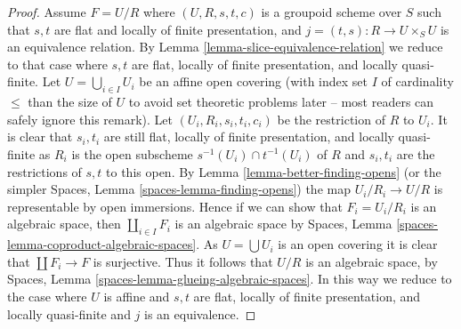 \documentclass[10pt,a4paper]{amsart}
\theoremstyle{plain}
\theoremstyle{definition}
\theoremstyle{remark}
\numberwithin{equation}{subsection}
\begin{document}
\begin{proof}
\medskip\noindent
Assume $F = U/R$ where $(U, R, s, t, c)$ is a groupoid scheme
over $S$ such that $s, t$ are flat and locally of finite presentation, and
$j = (t, s) : R \to U \times_S U$ is an equivalence relation. By
Lemma \ref{lemma-slice-equivalence-relation}
we reduce to that case where $s, t$ are flat,
locally of finite presentation, and locally quasi-finite.
Let $U = \bigcup_{i \in I} U_i$ be an affine open covering
(with index set $I$ of cardinality $\leq$ than the size of $U$ to avoid
set theoretic problems later -- most readers can safely ignore this remark).
Let $(U_i, R_i, s_i, t_i, c_i)$ be the restriction of $R$
to $U_i$. It is clear that $s_i, t_i$ are still flat, locally of finite
presentation, and locally quasi-finite as $R_i$ is the open subscheme
$s^{-1}(U_i) \cap t^{-1}(U_i)$ of $R$
and $s_i, t_i$ are the restrictions of $s, t$ to this open. By
Lemma \ref{lemma-better-finding-opens}
(or the simpler
Spaces, Lemma \ref{spaces-lemma-finding-opens})
the map $U_i/R_i \to U/R$ is representable by open immersions.
Hence if we can show that $F_i = U_i/R_i$ is an algebraic space, then
$\coprod_{i \in I} F_i$ is an algebraic space by
Spaces, Lemma \ref{spaces-lemma-coproduct-algebraic-spaces}.
As $U = \bigcup U_i$ is an open covering it is clear that
$\coprod F_i \to F$ is surjective. Thus
it follows that $U/R$ is an algebraic space, by
Spaces, Lemma \ref{spaces-lemma-glueing-algebraic-spaces}.
In this way we reduce to the case where $U$ is affine and $s, t$ are flat,
locally of finite presentation, and locally quasi-finite and
$j$ is an equivalence.


\end{proof}
\end{document}
